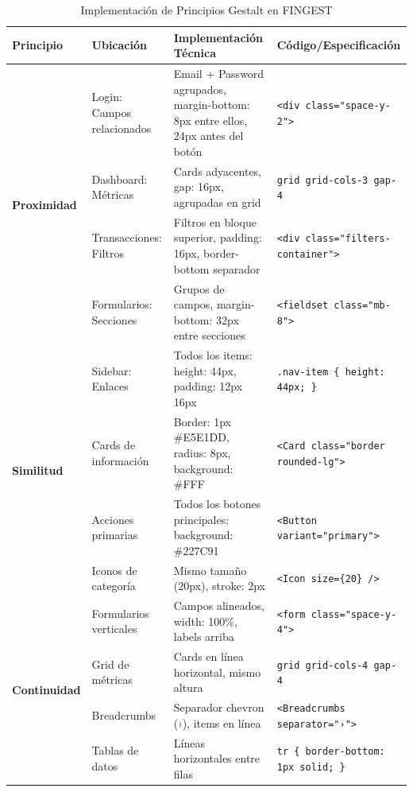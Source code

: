 \documentclass[12pt,a4paper,oneside]{article}
\begin{document}
\begin{table}[h]
\centering
\caption{Implementación de Principios Gestalt en FINGEST}
\label{tab:gestalt-implementacion}
\scriptsize
\begin{tabular}{|p{2cm}|p{2.5cm}|p{4cm}|p{3.5cm}|}
\hline
\textbf{Principio} & \textbf{Ubicación} & \textbf{Implementación Técnica} & \textbf{Código/Especificación} \\
\hline
\multirow{4}{*}{\textbf{Proximidad}} 
& Login: Campos relacionados 
& Email + Password agrupados, margin-bottom: 8px entre ellos, 24px antes del botón 
& \texttt{<div class="space-y-2">} \\
\cline{2-4}
& Dashboard: Métricas 
& Cards adyacentes, gap: 16px, agrupadas en grid 
& \texttt{grid grid-cols-3 gap-4} \\
\cline{2-4}
& Transacciones: Filtros 
& Filtros en bloque superior, padding: 16px, border-bottom separador 
& \texttt{<div class="filters-container">} \\
\cline{2-4}
& Formularios: Secciones 
& Grupos de campos, margin-bottom: 32px entre secciones 
& \texttt{<fieldset class="mb-8">} \\
\hline
\multirow{4}{*}{\textbf{Similitud}} 
& Sidebar: Enlaces 
& Todos los items: height: 44px, padding: 12px 16px 
& \texttt{.nav-item \{ height: 44px; \}} \\
\cline{2-4}
& Cards de información 
& Border: 1px \#E5E1DD, radius: 8px, background: \#FFF 
& \texttt{<Card class="border rounded-lg">} \\
\cline{2-4}
& Acciones primarias 
& Todos los botones principales: background: \#227C91 
& \texttt{<Button variant="primary">} \\
\cline{2-4}
& Iconos de categoría 
& Mismo tamaño (20px), stroke: 2px 
& \texttt{<Icon size=\{20\} />} \\
\hline
\multirow{4}{*}{\textbf{Continuidad}} 
& Formularios verticales 
& Campos alineados, width: 100\%, labels arriba 
& \texttt{<form class="space-y-4">} \\
\cline{2-4}
& Grid de métricas 
& Cards en línea horizontal, mismo altura 
& \texttt{grid grid-cols-4 gap-4} \\
\cline{2-4}
& Breadcrumbs 
& Separador chevron (›), items en línea 
& \texttt{<Breadcrumbs separator="›">} \\
\cline{2-4}
& Tablas de datos 
& Líneas horizontales entre filas 
& \texttt{tr \{ border-bottom: 1px solid; \}} \\
\hline
\end{tabular}
\end{table}
\end{document}
